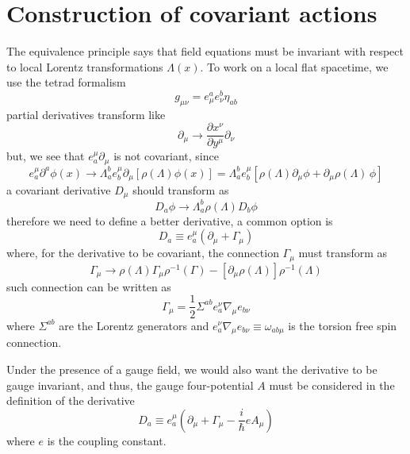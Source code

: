 \section{Construction of covariant actions}
The equivalence principle says that field equations must be invariant with respect to local Lorentz transformations $\Lambda(x)$. To work on a local flat spacetime, we use the tetrad formalism
\begin{equation}
	g_{\mu\nu}=e^a_\mu e^b_\nu \eta_{ab}
\end{equation}
partial derivatives transform like
\begin{equation}
	\partial_\mu\to\frac{\partial x^\nu}{\partial y^\mu}\partial_\nu
\end{equation}
but, we see that $e^\mu_a\partial_\mu$ is not covariant, since
\begin{equation}
	e^\mu_a\partial^a\phi(x)\to \Lambda^b_ae^\mu_b\partial_\mu\left[\rho\left(\Lambda\right)\phi(x)\right]= \Lambda^b_ae^\mu_b\left[\rho\left(\Lambda\right)\partial_\mu\phi+\partial_\mu\rho\left(\Lambda\right)\,\phi\right]
\end{equation}
a covariant derivative $D_\mu$ should transform as
\begin{equation}
	D_a\phi\to\Lambda_a^b\rho\left(\Lambda\right)D_b\phi
\end{equation}
therefore we need to define a better derivative, a common option is
\begin{equation}
	D_a\equiv e^\mu_a\left(\partial_\mu+\Gamma_\mu\right)
\end{equation}
where, for the derivative to be covariant, the connection $\Gamma_\mu$ must transform as
\begin{equation}
	\Gamma_\mu\to \rho\left(\Lambda\right)\Gamma_\mu\rho^{-1}\left(\Gamma\right)-\left[\partial_\mu\rho\left(\Lambda\right)\right]\rho^{-1}\left(\Lambda\right)
\end{equation} 
such connection can be written as
\begin{equation}
	\Gamma_\mu=\frac{1}{2}\Sigma^{ab}e^\nu_a\nabla_\mu e_{b\nu}
\end{equation}
where $\Sigma^{ab}$ are the Lorentz generators and $e^\nu_a\nabla_\mu e_{b\nu}\equiv \omega_{ab\mu}$ is the torsion free spin connection.

Under the presence of a gauge field, we would also want the derivative to be gauge invariant, and thus, the gauge four-potential $A$ must be considered in the definition of the derivative
\begin{equation}
	D_a\equiv e^\mu_a\left(\partial_\mu+\Gamma_\mu-\frac{i}{\hbar}eA_\mu\right)
\end{equation}
where $e$ is the coupling constant.

